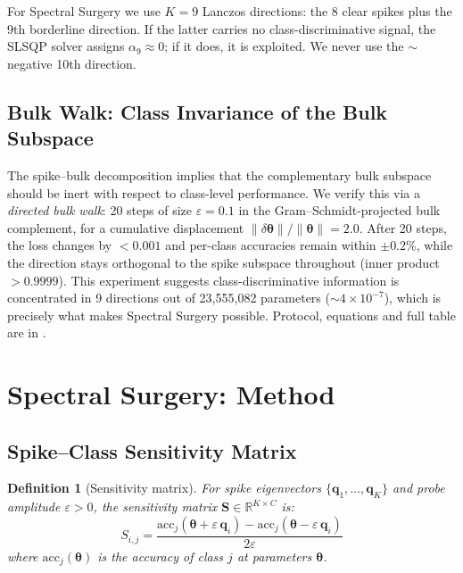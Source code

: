 \documentclass[11pt,a4paper]{article}
\newcommand{\R}{\mathbb{R}}
\newcommand{\mat}[1]{\bm{#1}}
\newcommand{\vect}[1]{\bm{#1}}
\newtheorem{definition}{Definition}
\begin{document}
For Spectral Surgery we use $K = 9$ Lanczos directions: the 8 clear
spikes plus the 9th borderline direction. If the latter carries no
class-discriminative signal, the SLSQP solver assigns
$\alpha_9 \approx 0$; if it does, it is exploited. We never use the
$\sim$negative 10th direction.

\subsection{Bulk Walk: Class Invariance of the Bulk Subspace}
\label{sec:bulk-walk}

The spike--bulk decomposition implies that the complementary bulk
subspace should be inert with respect to class-level performance.
We verify this via a \emph{directed bulk walk}: 20 steps of size
$\varepsilon = 0.1$ in the Gram--Schmidt-projected bulk complement,
for a cumulative displacement $\|\delta\vect{\theta}\|/\|\vect{\theta}\| = 2.0$.
After 20 steps, the loss changes by $< 0.001$ and per-class accuracies
remain within $\pm 0.2\%$, while the direction stays orthogonal to
the spike subspace throughout (inner product $> 0.9999$). This experiment suggests class-discriminative
information is concentrated in 9 directions out of 23,555,082
parameters (${\sim}4 \times 10^{-7}$), which is precisely what makes
Spectral Surgery possible. Protocol, equations and full table are in
.

\section{Spectral Surgery: Method}
\label{sec:method}

\subsection{Spike--Class Sensitivity Matrix}
\label{sec:sensitivity}

\begin{definition}[Sensitivity matrix]
\label{def:sensitivity}
For spike eigenvectors $\{\vect{q}_1, \ldots, \vect{q}_K\}$ and probe
amplitude $\varepsilon > 0$, the sensitivity matrix
$\mat{S} \in \R^{K \times C}$ is:
\begin{equation}
S_{i,j} = \frac{
  \mathrm{acc}_j(\vect{\theta} + \varepsilon\,\vect{q}_i)
  - \mathrm{acc}_j(\vect{\theta} - \varepsilon\,\vect{q}_i)
}{2\varepsilon}
\label{eq:sensitivity}
\end{equation}
where $\mathrm{acc}_j(\vect{\theta})$ is the accuracy of class $j$ at
parameters $\vect{\theta}$.
\end{definition}
\end{document}
